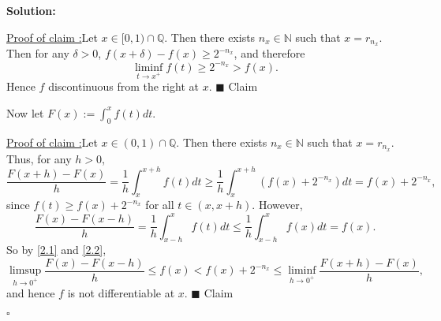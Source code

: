 \documentclass[12pt]{article}
\newcounter{ProofCounter}
\newcounter{ClaimCounter}[ProofCounter]
\newenvironment{Solution}{\stepcounter{ProofCounter}\textbf{Solution:}}{\hfill$\square$}
\newenvironment{claim}[1]{\vspace{1mm}\stepcounter{ClaimCounter}\par\noindent\underline{\bf Claim \theClaimCounter:}\space#1}{}
\newenvironment{claimproof}[1]{\par\noindent\underline{Proof of claim \theClaimCounter:}\space#1}{\hfill $\blacksquare$ Claim \theClaimCounter}
\begin{document}
\begin{Solution}
  \begin{claim}
    $f$ discontinuous from the right at every rational in $[0, 1)$.
  \end{claim}
  \begin{claimproof}
    Let $x \in [0, 1) \cap \mathbb{Q}$. Then there exists $n_x \in \mathbb{N}$ such that $x = r_{n_x}$. Then for any $\delta > 0$,
    $f(x + \delta) - f(x) \geq 2^{-n_x}$, and therefore 
    \[
      \liminf_{t\rightarrow x^{+}}f(t) \geq 2^{-n_x} > f(x).
    \]
    Hence $f$ discontinuous from the right at $x$.
  \end{claimproof}

  Now let $F(x) := \int_{0}^{x}f(t)dt$.

  \begin{claimproof}
    Let $x \in (0,1) \cap \mathbb{Q}$.
    Then there exists $n_{x} \in \mathbb{N}$ such that $x = r_{n_x}$. Thus, for any $h > 0$,
    \begin{equation}
      \frac{F(x+h) - F(x)}{h} = \frac{1}{h}\int_{x}^{x+h}f(t)dt \geq \frac{1}{h} \int_{x}^{x+h}(f(x) + 2^{-n_x})dt = f(x) + 2^{-n_x},
        \label{2.1}
    \end{equation}
    since $f(t) \geq f(x) + 2^{-n_x}$ for all $t \in (x, x+h)$. However,
    \begin{equation}
      \frac{F(x) - F(x-h)}{h} = \frac{1}{h}\int_{x-h}^{x}f(t)dt \leq \frac{1}{h}\int_{x-h}^{x}f(x)dt = f(x).
      \label{2.2}
    \end{equation}
    So by \eqref{2.1} and \eqref{2.2}, 
    \[
      \limsup_{h\rightarrow 0^{+}}\frac{F(x) - F(x-h)}{h} \leq f(x) < f(x) + 2^{-n_x} \leq \liminf_{h\rightarrow 0^{+}}\frac{F(x+h) - F(x)}{h},
    \]
    and hence $f$ is not differentiable at $x$.
  \end{claimproof}

\end{Solution}
\end{document}
